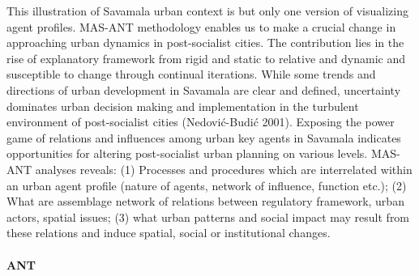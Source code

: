 \documentclass[11pt]{report}
\begin{document}
This illustration of Savamala urban context is but only one version of visualizing agent profiles. MAS-ANT methodology enables us to make a crucial change in approaching urban dynamics in post-socialist cities. The contribution lies in the rise of explanatory framework from rigid and static to relative and dynamic and susceptible to change through continual iterations. While some trends and directions of urban development in Savamala are clear and defined, uncertainty dominates urban decision making and implementation in the turbulent environment of post-socialist cities (Nedović-Budić 2001). Exposing the power game of relations and influences among urban key agents in Savamala indicates opportunities for altering post-socialist urban planning on various levels. MAS-ANT analyses reveals: 
(1)	Processes and procedures which are interrelated within an urban agent profile (nature of agents, network of influence, function etc.);
(2)	What are assemblage network of relations between regulatory framework, urban actors, spatial issues;
(3)	what  urban  patterns  and  social  impact  may result  from  these  relations  and  induce  spatial,  social  or institutional changes.

\paragraph{ANT}
 
\end{document}
